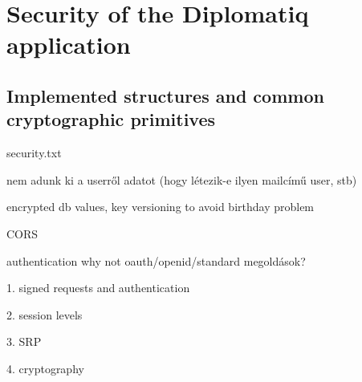 \chapter{Security of the Diplomatiq application}
\label{chapter:security}

\section{Implemented structures and common cryptographic primitives}

security.txt

nem adunk ki a userről adatot (hogy létezik-e ilyen mailcímű user, stb)

encrypted db values, key versioning to avoid birthday problem

CORS

authentication why not oauth/openid/standard megoldások?

    1. signed requests and authentication

    2. session levels

    3. SRP

    4. cryptography
